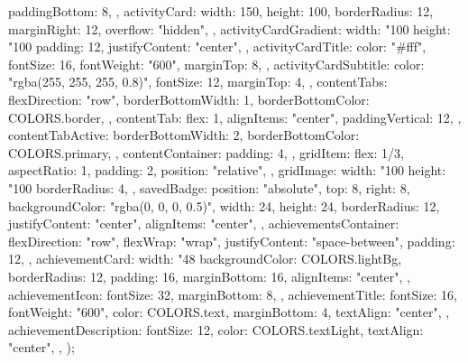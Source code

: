 {{    paddingBottom: 8,
  },
  activityCard: {
    width: 150,
    height: 100,
    borderRadius: 12,
    marginRight: 12,
    overflow: "hidden",
  },
  activityCardGradient: {
    width: "100%
    height: "100%
    padding: 12,
    justifyContent: "center",
  },
  activityCardTitle: {
    color: "#fff",
    fontSize: 16,
    fontWeight: "600",
    marginTop: 8,
  },
  activityCardSubtitle: {
    color: "rgba(255, 255, 255, 0.8)",
    fontSize: 12,
    marginTop: 4,
  },
  contentTabs: {
    flexDirection: "row",
    borderBottomWidth: 1,
    borderBottomColor: COLORS.border,
  },
  contentTab: {
    flex: 1,
    alignItems: "center",
    paddingVertical: 12,
  },
  contentTabActive: {
    borderBottomWidth: 2,
    borderBottomColor: COLORS.primary,
  },
  contentContainer: {
    padding: 4,
  },
  gridItem: {
    flex: 1/3,
    aspectRatio: 1,
    padding: 2,
    position: "relative",
  },
  gridImage: {
    width: "100%
    height: "100%
    borderRadius: 4,
  },
  savedBadge: {
    position: "absolute",
    top: 8,
    right: 8,
    backgroundColor: "rgba(0, 0, 0, 0.5)",
    width: 24,
    height: 24,
    borderRadius: 12,
    justifyContent: "center",
    alignItems: "center",
  },
  achievementsContainer: {
    flexDirection: "row",
    flexWrap: "wrap",
    justifyContent: "space-between",
    padding: 12,
  },
  achievementCard: {
    width: "48%
    backgroundColor: COLORS.lightBg,
    borderRadius: 12,
    padding: 16,
    marginBottom: 16,
    alignItems: "center",
  },
  achievementIcon: {
    fontSize: 32,
    marginBottom: 8,
  },
  achievementTitle: {
    fontSize: 16,
    fontWeight: "600",
    color: COLORS.text,
    marginBottom: 4,
    textAlign: "center",
  },
  achievementDescription: {
    fontSize: 12,
    color: COLORS.textLight,
    textAlign: "center",
  },
});
